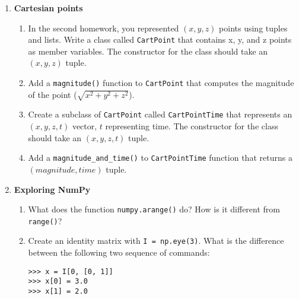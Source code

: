 \documentclass{article}
\newcounter{points}
\begin{document}
\begin{enumerate}
\item \textbf{Cartesian points}
\begin{enumerate}
\item In the second homework, you represented $(x, y, z)$ points using tuples and lists.  Write a class called \texttt{CartPoint} that contains x, y, and z points as member variables.  The constructor for the class should take an $(x, y, z)$ tuple.
\end{enumerate}

\begin{enumerate}
\setcounter{enumii}{1}
\item Add a \texttt{magnitude()} function to \texttt{CartPoint} that computes the magnitude of the point ($\sqrt{x^2 + y^2 + z^2}$).
\end{enumerate}

\begin{enumerate}
\setcounter{enumii}{2}
\item Create a subclass of \texttt{CartPoint} called \texttt{CartPointTime} that represents an $(x, y, z, t)$ vector, $t$ representing time.  The constructor for the class should take an $(x, y, z, t)$ tuple.
\end{enumerate}

\begin{enumerate}
\setcounter{enumii}{3}
\item Add a \texttt{magnitude\_and\_time()} to \texttt{CartPointTime} function that returns a $(magnitude, time)$ tuple.
\end{enumerate}

\newpage
\item \textbf{Exploring NumPy}

\begin{enumerate}
\item What does the function \texttt{numpy.arange()} do? How is it different from \texttt{range()}?
\end{enumerate}

\begin{enumerate}
\setcounter{enumii}{1}
\item Create an identity matrix with \texttt{I = np.eye(3)}.  What is the difference between the following two sequence of commands:
\begin{verbatim}
>>> x = I[0, [0, 1]]
>>> x[0] = 3.0
>>> x[1] = 2.0
\end{verbatim}

\vspace{0.1in}


\end{enumerate}
\end{enumerate}
\end{document}
